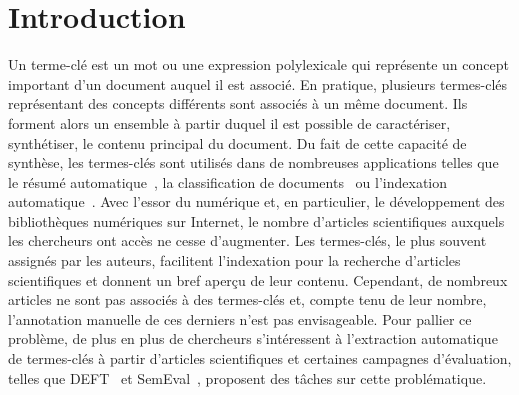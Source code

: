 \section{Introduction}
\label{sec:introduction}
  Un terme-clé est un mot ou une expression polylexicale qui représente un
  concept important d'un document auquel il est associé. En pratique, plusieurs
  termes-clés représentant des concepts différents sont associés à un même
  document. Ils forment alors un ensemble à partir duquel il est
  possible de caractériser, synthétiser, le contenu principal du document. Du
  fait de cette capacité de synthèse, les termes-clés sont utilisés dans de
  nombreuses applications telles que le résumé
  automatique~\cite{avanzo2005keyphrase}, la classification de
  documents~\cite{han2007webdocumentclustering} ou l'indexation
  automatique~\cite{medelyan2008smalltrainingset}. Avec l'essor du numérique et,
  en particulier, le développement des bibliothèques numériques sur Internet, le
  nombre d'articles scientifiques auxquels les chercheurs ont accès ne cesse
  d'augmenter. Les termes-clés, le plus souvent assignés par les auteurs,
  facilitent l'indexation pour la recherche d'articles scientifiques et donnent
  un bref aperçu de leur contenu. Cependant, de nombreux articles ne sont pas
  associés à des termes-clés et, compte tenu de leur nombre, l'annotation
  manuelle de ces derniers n'est pas envisageable. Pour pallier ce problème, de
  plus en plus de chercheurs s'intéressent à l'extraction automatique de
  termes-clés à partir d'articles scientifiques et certaines campagnes
  d'évaluation, telles que DEFT~\cite{paroubek2012deft} et
  SemEval~\cite{kim2010semeval}, proposent des tâches sur cette problématique.

